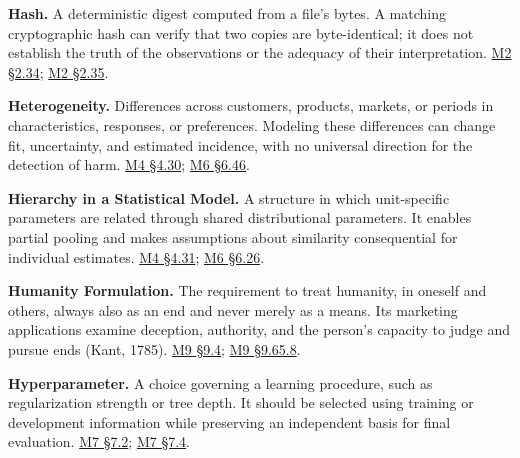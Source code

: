 \noindent\textbf{Hash.} A deterministic digest computed from a file's bytes. A
matching cryptographic hash can verify that two copies are
byte-identical; it does not establish the truth of the observations or
the adequacy of their interpretation.
\href{Marketing_Analytics_Lecture_Notes.pdf\#M02-worked-example-retention-and-pending-cancellation}{M2
§2.34};
\href{Marketing_Analytics_Lecture_Notes.pdf\#M02-reproducing-a-result-and-assessing-its-records}{M2
§2.35}.

\noindent\textbf{Heterogeneity.} Differences across customers, products, markets,
or periods in characteristics, responses, or preferences. Modeling these
differences can change fit, uncertainty, and estimated incidence, with
no universal direction for the detection of harm.
\href{Marketing_Analytics_Lecture_Notes.pdf\#M04-heterogeneous-demand-market-power-and-consumer-interests}{M4
§4.30};
\href{Marketing_Analytics_Lecture_Notes.pdf\#M06-greater-precision-and-fewer-detected-harms}{M6
§6.46}.

\noindent\textbf{Hierarchy in a Statistical Model.} A structure in which
unit-specific parameters are related through shared distributional
parameters. It enables partial pooling and makes assumptions about
similarity consequential for individual estimates.
\href{Marketing_Analytics_Lecture_Notes.pdf\#M04-released-retail-data-integrated-heterogeneity-and-competing-explanations}{M4
§4.31};
\href{Marketing_Analytics_Lecture_Notes.pdf\#M06-store-decisions-and-partial-pooling}{M6
§6.26}.

\noindent\textbf{Humanity Formulation.} The requirement to treat humanity, in
oneself and others, always also as an end and never merely as a means.
Its marketing applications examine deception, authority, and the
person's capacity to judge and pursue ends (Kant, 1785).
\hyperref[M09-respect-for-persons-and-commercial-exchange]{M9
§9.4};
\hyperref[M09-maxims-of-data-production-and-disclosure]{M9
§9.65.8}.

\noindent\textbf{Hyperparameter.} A choice governing a learning procedure, such
as regularization strength or tree depth. It should be selected using
training or development information while preserving an independent
basis for final evaluation.
\href{Marketing_Analytics_Lecture_Notes.pdf\#M07-baselines-loss-functions-and-regularization}{M7
§7.2};
\href{Marketing_Analytics_Lecture_Notes.pdf\#M07-validation-cross-validation-and-leakage}{M7
§7.4}.

